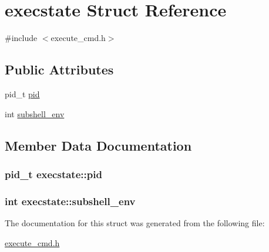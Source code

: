 \hypertarget{structexecstate}{}\section{execstate Struct Reference}
\label{structexecstate}


{\ttfamily \#include $<$execute\+\_\+cmd.\+h$>$}

\subsection*{Public Attributes}
\begin{DoxyCompactItemize}
\item 
pid\+\_\+t \hyperlink{structexecstate_af6e5f0a8dbfecb8a58b69505a0006841}{pid}
\item 
int \hyperlink{structexecstate_a1396897622963c57e753be7d2cef693c}{subshell\+\_\+env}
\end{DoxyCompactItemize}


\subsection{Member Data Documentation}
\subsubsection[{\texorpdfstring{pid}{pid}}]{\setlength{\rightskip}{0pt plus 5cm}pid\+\_\+t execstate\+::pid}\hypertarget{structexecstate_af6e5f0a8dbfecb8a58b69505a0006841}{}\label{structexecstate_af6e5f0a8dbfecb8a58b69505a0006841}
\subsubsection[{\texorpdfstring{subshell\+\_\+env}{subshell_env}}]{\setlength{\rightskip}{0pt plus 5cm}int execstate\+::subshell\+\_\+env}\hypertarget{structexecstate_a1396897622963c57e753be7d2cef693c}{}\label{structexecstate_a1396897622963c57e753be7d2cef693c}


The documentation for this struct was generated from the following file\+:\begin{DoxyCompactItemize}
\item 
\hyperlink{execute__cmd_8h}{execute\+\_\+cmd.\+h}\end{DoxyCompactItemize}
